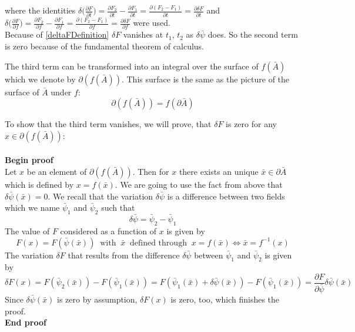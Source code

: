 \documentclass{article}
\begin{document}
where the identities $\delta \big(\frac{\partial F} {\partial t}\big)
= \frac{\partial F_2} {\partial t} - \frac{\partial F_1} {\partial t}
= \frac{\partial (F_2 - F_1)} {\partial t}
= \frac{\partial \delta F} {\partial t}$ 
and
$\delta \big(\frac{\partial F} {\partial f}\big)
= \frac{\partial F_2} {\partial f} - \frac{\partial F_1} {\partial f}
= \frac{\partial (F_2 - F_1)} {\partial f}
= \frac{\partial \delta F} {\partial f}$ 
were used. \\

Because of \ref{deltaFDefinition}
$\delta F$ vanishes at $t_1$, $t_2$ as $\delta \bar{\psi}$ does. So the second term is zero because of the fundamental theorem of calculus.

The third term can be transformed into an integral over the surface of $f(\bar{A})$ which we denote by $\partial (f(\bar{A}))$. This surface is the same as the picture of the surface of $\bar{A}$ under $f$: 
\begin{equation}
\partial (f(\bar{A})) = f(\partial \bar{A})
\end{equation}

To show that the third term vanishes, we will prove, that $\delta F$ is zero for any $x \in \partial (f(\bar{A}))$:
\\ 
\\

\noindent \textbf{Begin proof}
\\
Let $x$ be an element of $\partial (f(\bar{A}))$. Then for $x$ there exists an unique $\bar{x} \in \partial \bar{A}$ which is defined by $x=f(\bar{x})$. We are going to use the fact from above that $\delta \bar{\psi}(\bar{x}) = 0$. 
We recall that the variation $\delta \bar{\psi}$ is a difference between two fields which we name $\bar{\psi}_1$ and $\bar{\psi}_2$ such that
\begin{equation}
\delta \bar{\psi} = \bar{\psi}_2 - \bar{\psi}_1
\end{equation}
The value of $F$ considered as a function of $x$ is given by 
\begin{equation} \label{defineFOfx}
F(x) = F(\bar{\psi}(\bar{x})) \;\; \text{with} \;\; \bar{x} \;\; \text{defined through} \;\; x=f(\bar{x}) 
\iff \bar{x} = f^{-1}(x)
\end{equation}
The variation $\delta F$ that results from the difference $\delta \bar{\psi}$ between $\bar{\psi}_1$ and $\bar{\psi}_2$ is given by
\begin{equation}
\delta F(x) = F(\bar{\psi}_2(\bar{x})) - F(\bar{\psi}_1(\bar{x})) 
= F(\bar{\psi}_1(\bar{x}) + \delta \bar{\psi} (\bar{x})) - F(\bar{\psi}_1(\bar{x})) 
= \frac{\partial F}{\partial \bar{\psi}} \delta \bar{\psi} (\bar{x})
\end{equation}
Since $\delta \bar{\psi}(\bar{x})$ is zero by assumption, $\delta F(x)$ is zero, too, which finishes the proof.
\\
\textbf{End proof}
\\
\\
\end{document}
